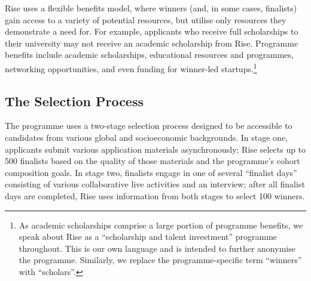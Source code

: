 Rise uses a flexible benefits model, where winners (and, in some cases, finalists) gain access to a variety of potential resources, but utilise only resources they demonstrate a need for. For example, applicants who receive full scholarships to their university may not receive an academic scholarship from Rise. Programme benefits include academic scholarships, educational resources and programmes, networking opportunities, and even funding for winner-led startups.\footnote{As academic scholarships comprise a large portion of programme benefits, we speak about Rise as a ``scholarship and talent investment'' programme throughout. This is our own language and is intended to further anonymise the programme. Similarly, we replace the programme-specific term ``winners'' with ``scholars''.}

\subsection{The Selection Process}
The programme uses a two-stage selection process designed to be accessible to candidates from various global and socioeconomic backgrounds. In stage one, applicants submit various application materials asynchronously; Rise selects up to 500 finalists based on the quality of those materials and the programme's cohort composition goals. In stage two, finalists engage in one of several ``finalist days'' consisting of various collaborative live activities and an interview; after all finalist days are completed, Rise uses information from both stages to select 100 winners.

